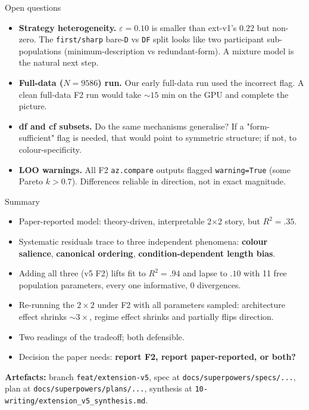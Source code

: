 \documentclass[10pt,aspectratio=169]{beamer}
\newcommand{\hl}[1]{{\color{hlblue}\textbf{#1}}}
\begin{document}
\begin{frame}{Open questions}
\small
\begin{itemize}\itemsep0.4em
  \item \textbf{Strategy heterogeneity.} $\varepsilon = 0.10$ is smaller than ext-v1's $0.22$ but non-zero. The \texttt{first/sharp} bare-\texttt{D} vs \texttt{DF} split looks like two participant sub-populations (minimum-description vs redundant-form). A mixture model is the natural next step.

  \item \textbf{Full-data ($N = 9586$) run.} Our early full-data run used the incorrect flag. A clean full-data F2 run would take $\sim\!15$ min on the GPU and complete the picture.

  \item \textbf{df and cf subsets.} Do the same mechanisms generalise? If a "form-sufficient" flag is needed, that would point to symmetric structure; if not, to colour-specificity.

  \item \textbf{LOO warnings.} All F2 \texttt{az.compare} outputs flagged \texttt{warning=True} (some Pareto $k > 0.7$). Differences reliable in direction, not in exact magnitude.
\end{itemize}
\end{frame}

\begin{frame}{Summary}
\small
\begin{itemize}\itemsep0.3em
  \item Paper-reported model: theory-driven, interpretable 2$\times$2 story, but $R^2 = .35$.
  \item Systematic residuals trace to three independent phenomena: \hl{colour salience}, \hl{canonical ordering}, \hl{condition-dependent length bias}.
  \item Adding all three (v5 F2) lifts fit to $R^2 = .94$ and lapse to $.10$ with 11 free population parameters, every one informative, 0 divergences.
  \item Re-running the $2\!\times\!2$ under F2 with all parameters sampled: architecture effect shrinks $\sim 3\times$, regime effect shrinks and partially flips direction.
  \item Two readings of the tradeoff; both defensible.
  \item Decision the paper needs: \hl{report F2, report paper-reported, or both?}
\end{itemize}

\vspace{1em}
\hl{Artefacts:} \footnotesize branch \texttt{feat/extension-v5},
spec at \texttt{docs/superpowers/specs/...},
plan at \texttt{docs/superpowers/plans/...},
synthesis at \texttt{10-writing/extension\_v5\_synthesis.md}.
\end{frame}
\end{document}
